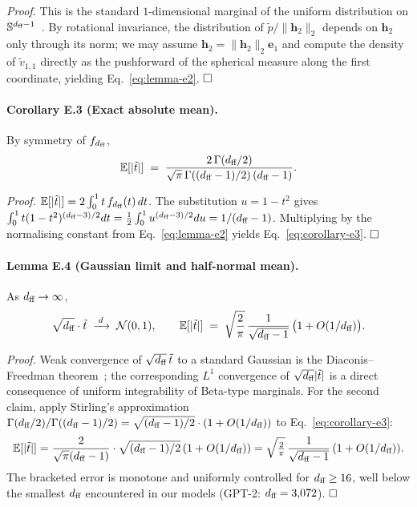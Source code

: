 \emph{Proof.} This is the standard $1$-dimensional marginal of the uniform
distribution on $\mathbb{S}^{d_{\text{ff}}-1}$~\citep{stam1982limit,fang1990symmetric}.
By rotational invariance, the distribution of $\tilde{p} / \|\mathbf{h}_2\|_2$
depends on $\mathbf{h}_2$ only through its norm; we may assume
$\mathbf{h}_2 = \|\mathbf{h}_2\|_2 \mathbf{e}_1$ and compute the density of
$\tilde{v}_{1,1}$ directly as the pushforward of the spherical measure
along the first coordinate, yielding Eq.~\eqref{eq:lemma-e2}. $\hfill\square$

\paragraph{Corollary E.3 (Exact absolute mean).}
By symmetry of $f_{d_{\text{ff}}}$,
\begin{equation}
  \label{eq:corollary-e3}
  \mathbb{E}[|\tilde{t}|] \;=\; \frac{2\,\Gamma(d_{\text{ff}}/2)}{\sqrt{\pi}\,\Gamma((d_{\text{ff}}-1)/2)\,(d_{\text{ff}}-1)}.
\end{equation}

\emph{Proof.} $\mathbb{E}[|\tilde{t}|] = 2\int_0^1 t\,f_{d_{\text{ff}}}(t)\,dt$.
The substitution $u = 1 - t^2$ gives
$\int_0^1 t(1-t^2)^{(d_{\text{ff}}-3)/2} dt = \tfrac{1}{2}\int_0^1 u^{(d_{\text{ff}}-3)/2} du = 1/(d_{\text{ff}}-1)$.
Multiplying by the normalising constant from Eq.~\eqref{eq:lemma-e2}
yields Eq.~\eqref{eq:corollary-e3}. $\hfill\square$

\paragraph{Lemma E.4 (Gaussian limit and half-normal mean).}
As $d_{\text{ff}} \to \infty$,
\begin{equation}
  \label{eq:lemma-e4}
  \sqrt{d_{\text{ff}}}\cdot\tilde{t} \;\xrightarrow{\;d\;}\; \mathcal{N}(0, 1), \qquad
  \mathbb{E}[|\tilde{t}|] \;=\; \sqrt{\frac{2}{\pi}}\,\frac{1}{\sqrt{d_{\text{ff}} - 1}}\,\bigl(1 + O(1/d_{\text{ff}})\bigr).
\end{equation}

\emph{Proof.} Weak convergence of $\sqrt{d_{\text{ff}}}\,\tilde{t}$ to a standard
Gaussian is the Diaconis--Freedman theorem~\citep{diaconis1987dozen};
the corresponding $L^1$ convergence of $\sqrt{d_{\text{ff}}}|\tilde{t}|$ is a
direct consequence of uniform integrability of Beta-type marginals.
For the second claim, apply Stirling's approximation
$\Gamma(d_{\text{ff}}/2)/\Gamma((d_{\text{ff}}-1)/2) = \sqrt{(d_{\text{ff}}-1)/2}\cdot(1 + O(1/d_{\text{ff}}))$
to Eq.~\eqref{eq:corollary-e3}:
\[
  \mathbb{E}[|\tilde{t}|] = \frac{2}{\sqrt{\pi}(d_{\text{ff}}-1)} \cdot \sqrt{(d_{\text{ff}}-1)/2}\,(1 + O(1/d_{\text{ff}}))
     = \sqrt{\tfrac{2}{\pi}}\,\frac{1}{\sqrt{d_{\text{ff}}-1}}\,(1 + O(1/d_{\text{ff}})).
\]
The bracketed error is monotone and uniformly controlled for
$d_{\text{ff}} \geq 16$, well below the smallest $d_{\text{ff}}$ encountered in our models
(GPT-2: $d_{\text{ff}} = 3{,}072$). $\hfill\square$

